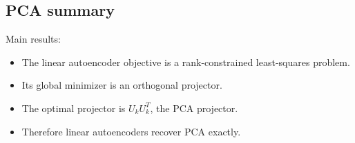 \documentclass[%
oneside,                 %
final,                   %
10pt]{article}
\begin{document}
\subsection{PCA summary}

\begin{block}{Main results: }
\begin{itemize}
\item The linear autoencoder objective is a rank-constrained least-squares problem.

\item Its global minimizer is an orthogonal projector.

\item The optimal projector is \(U_kU_k^T\), the PCA projector.

\item Therefore linear autoencoders recover PCA exactly.
\end{itemize}

\noindent
\end{block} 


\end{document}
